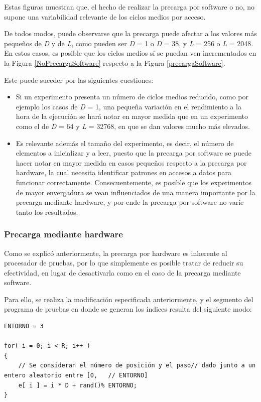 \documentclass[conference]{IEEEtran}
\begin{document}
Estas figuras muestran que, el hecho de realizar la precarga por software o no, no supone una variabilidad relevante de los ciclos medios por acceso.

De todos modos, puede observarse que la precarga puede afectar a los valores más pequeños de \textit{D} y de \textit{L}, como pueden ser \textit{D} = 1 o \textit{D} = 38, y \textit{L} = 256 o \textit{L} = 2048. En estos casos, es posible que los ciclos medios sí se puedan ven incrementados en la Figura \ref{NoPrecargaSoftware} respecto a la Figura \ref{precargaSoftware}.

Este puede suceder por las siguientes cuestiones:

\begin{itemize}
    \item Si un experimento presenta un número de ciclos medios reducido, como por ejemplo los casos de \textit{D} = 1, una pequeña variación en el rendimiento a la hora de la ejecución se hará notar en mayor medida que en un experimento como el de \textit{D} = 64 y \textit{L} = 32768, en que se dan valores mucho más elevados.
    \item Es relevante además el tamaño del experimento, es decir, el número de elementos a inicializar y a leer, puesto que la precarga por software se puede hacer notar en mayor medida en casos pequeños respecto a la precarga por hardware, la cual necesita identificar patrones en accesos a datos para funcionar correctamente. Consecuentemente, es posible que los experimentos de mayor envergadura se vean influenciados de una manera importante por la precarga mediante hardware, y por ende la precarga por software no varíe tanto los resultados.
\end{itemize}

\subsubsection{Precarga mediante hardware}

Como se explicó anteriormente, la precarga por hardware es inherente al procesador de pruebas, por lo que simplemente es posible tratar de reducir su efectividad, en lugar de desactivarla como en el caso de la precarga mediante software.

Para ello, se realiza la modificación especificada anteriormente, y el segmento del programa de pruebas en donde se generan los índices resulta del siguiente modo:

\begin{lstlisting}[style=CStyle, title=Programa de pruebas en el que se trata de evitar la precarga mediante hardware.]
ENTORNO = 3

for( i = 0; i < R; i++ )
{
    // Se consideran el número de posición y el paso// dado junto a un entero aleatorio entre [0,   // ENTORNO]
    e[ i ] = i * D + rand()% ENTORNO;
}
\end{lstlisting}
\end{document}
